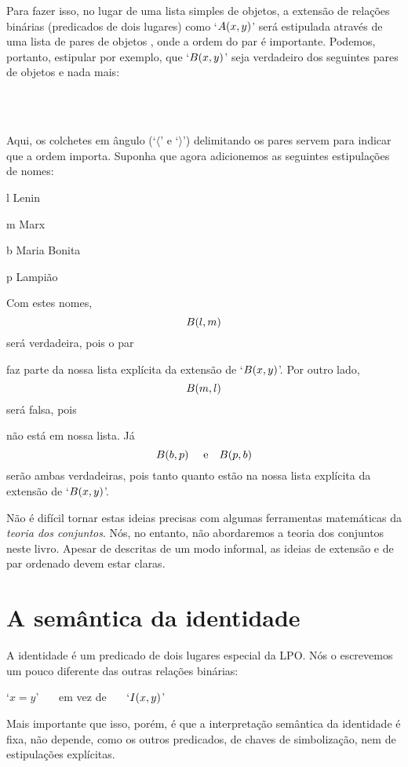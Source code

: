 Para fazer isso, no lugar de uma lista simples de objetos, a extensão de relações binárias (predicados de dois lugares) como `$\mathord{A}(x,y)$' será estipulada através de uma lista de pares de objetos , onde a ordem do par é importante.
Podemos, portanto, estipular por exemplo, que `$\mathord{B}(x,y)$' seja verdadeiro dos seguintes pares de objetos e nada mais:
	\begin{center}
		\\
		\\
	\end{center}
Aqui, os colchetes em ângulo (`$\langle$' e `$\rangle$') delimitando os pares servem para indicar que a ordem importa.
Suponha que agora adicionemos as seguintes estipulações de nomes:
	\begin{ekey}
		\item[l] Lenin
		\item[m] Marx
		\item[b] Maria Bonita
		\item[p] Lampião
	\end{ekey}
Com estes nomes,
$$\mathord{B}(l,m)$$
será verdadeira, pois o par
\begin{center}
\end{center}
faz parte da nossa lista explícita da extensão de `$\mathord{B}(x,y)$'.
Por outro lado,
$$\mathord{B}(m,l)$$
será falsa, pois
\begin{center}
\end{center}
não está em nossa lista.
Já
$$\atom{B}{b,p} \ \ \ \ \text{e} \ \ \ \atom{B}{p,b}$$
serão ambas verdadeiras, pois tanto  quanto  estão na nossa lista explícita da extensão de `$\mathord{B}(x,y)$'.

Não é difícil tornar estas ideias precisas com algumas ferramentas matemáticas da \emph{teoria dos conjuntos}.
Nós, no entanto, não abordaremos a teoria dos conjuntos neste livro.
Apesar de descritas de um modo informal, as ideias de extensão e de par ordenado devem estar claras.


\section{A semântica da identidade}
A identidade é um predicado de dois lugares especial da LPO.
Nós o escrevemos um pouco diferente das outras relações binárias:
\begin{center}
	`$x=y$' \ \ \ em vez de \ \ \ `$\mathord{I}(x,y)$'
\end{center}
Mais importante que isso, porém, é que a interpretação semântica da identidade é fixa, não depende, como os outros predicados, de chaves de simbolização, nem de estipulações explícitas. 


